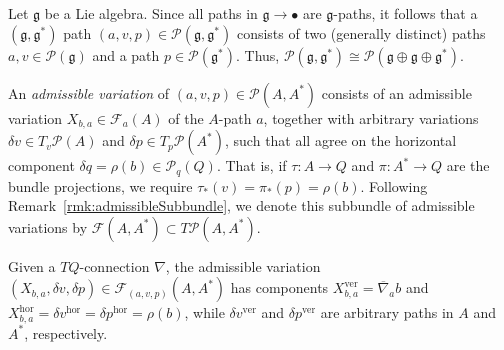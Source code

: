 \documentclass[pdftex]{sigma}
\numberwithin{equation}{section}
\begin{document}
\begin{Example} \label{ex:lieAlgebraPartI}
Let $ \mathfrak{g} $ be a Lie algebra. Since all paths in $\mathfrak{g} \rightarrow \bullet $ are $\mathfrak{g}$-paths, it follows that a~$ ( \mathfrak{g} , \mathfrak{g} ^\ast ) $ path $ ( a, v , p ) \in \mathcal{P} ( \mathfrak{g} , \mathfrak{g} ^\ast ) $ consists of two (generally distinct) paths $ a, v \in \mathcal{P} ( \mathfrak{g} ) $ and a path $ p \in \mathcal{P} ( \mathfrak{g} ^\ast ) $. Thus, $ \mathcal{P} ( \mathfrak{g} , \mathfrak{g} ^\ast ) \cong \mathcal{P} ( \mathfrak{g} \oplus \mathfrak{g} \oplus \mathfrak{g} ^\ast ) $.
\end{Example}

\begin{Definition}
An \emph{admissible variation} of $ ( a, v, p ) \in \mathcal{P} ( A, A ^\ast ) $ consists of an admissible variation $ X _{ b, a } \in \mathcal{F} _a (A) $ of the $A$-path $a$, together with arbitrary variations $ \delta v \in T _v \mathcal{P} ( A ) $ and $ \delta p \in T _p \mathcal{P} ( A ^\ast ) $, such that all agree on the horizontal component $ \delta q = \rho (b) \in \mathcal{P} _q (Q) $. That is, if $ \tau \colon A \rightarrow Q $ and $ \pi \colon A ^\ast \rightarrow Q $ are the bundle projections, we require $ \tau _\ast (v) = \pi _\ast (p) = \rho (b) $. Following Remark~\ref{rmk:admissibleSubbundle}, we denote this subbundle of admissible variations by $ \mathcal{F} (A, A ^\ast ) \subset T \mathcal{P} ( A, A ^\ast ) $.
\end{Definition}

\begin{Remark}
Given a $ T Q $-connection $ \nabla $, the admissible variation $ ( X _{ b, a } , \delta v, \delta p ) \in \mathcal{F} _{ ( a, v, p ) } ( A , A ^\ast ) $ has components $ X _{ b, a } ^\text{ver} = \overline{ \nabla } _a b $ and $ X _{ b, a } ^\text{hor} = \delta v ^\text{hor} = \delta p ^\text{hor} = \rho (b) $, while $ \delta v ^\text{ver} $ and $ \delta p ^\text{ver} $ are arbitrary paths in $A$ and $ A ^\ast $, respectively.
\end{Remark}
\end{document}
